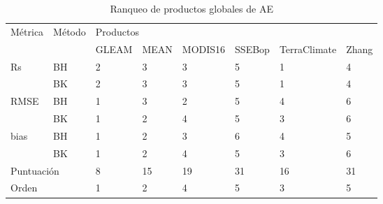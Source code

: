 \begin{table}[hbt]
\caption{Ranqueo de productos globales de AE}
\label{tab:Table_rank}
\begin{tabular}{llllllll}
\hline
\multirow{2}{*}{Métrica} & \multirow{2}{*}{Método} & \multicolumn{6}{l}{Productos}                          \\
                         &                             & GLEAM & MEAN & MODIS16 & SSEBop & TerraClimate & Zhang \\ \hline
Rs                       & BH                          & 2     & 3    & 3       & 5      & 1            & 4     \\
                         & BK                          & 2     & 3    & 3       & 5      & 1            & 4     \\
RMSE                     & BH                          & 1     & 3    & 2       & 5      & 4            & 6     \\
                         & BK                          & 1     & 2    & 4       & 5      & 3            & 6     \\
bias                     & BH                          & 1     & 2    & 3       & 6      & 4            & 5     \\
                         & BK                          & 1     & 2    & 4       & 5      & 3            & 6     \\
\multicolumn{2}{l}{Puntuación}                         & 8     & 15   & 19      & 31     & 16           & 31    \\
\multicolumn{2}{l}{Orden}                              & 1     & 2    & 4       & 5      & 3            & 5    \\ \hline
\end{tabular}
\end{table}